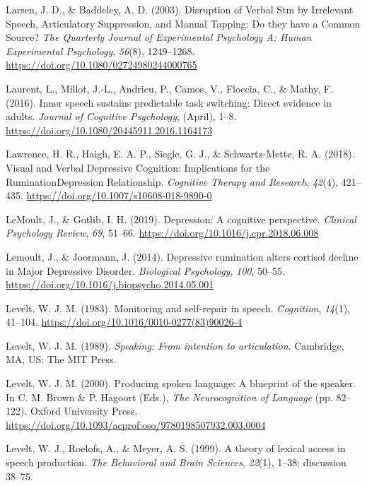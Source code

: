 \documentclass[a4paper,12pt,twoside,openright,oldfontcommands,final]{memoir}
\begin{document}
\leavevmode\hypertarget{ref-larsen_disruption_2003}{}%
Larsen, J. D., \& Baddeley, A. D. (2003). Disruption of Verbal Stm by Irrelevant Speech, Articulatory Suppression, and Manual Tapping: Do they have a Common Source? \emph{The Quarterly Journal of Experimental Psychology A: Human Experimental Psychology}, \emph{56}(8), 1249--1268. \url{https://doi.org/10.1080/02724980244000765}

\leavevmode\hypertarget{ref-Laurent2016}{}%
Laurent, L., Millot, J.-L., Andrieu, P., Camos, V., Floccia, C., \& Mathy, F. (2016). Inner speech sustains predictable task switching: Direct evidence in adults. \emph{Journal of Cognitive Psychology}, (April), 1--8. \url{https://doi.org/10.1080/20445911.2016.1164173}

\leavevmode\hypertarget{ref-lawrence_visual_2018}{}%
Lawrence, H. R., Haigh, E. A. P., Siegle, G. J., \& Schwartz-Mette, R. A. (2018). Visual and Verbal Depressive Cognition: Implications for the RuminationDepression Relationship. \emph{Cognitive Therapy and Research}, \emph{42}(4), 421--435. \url{https://doi.org/10.1007/s10608-018-9890-0}

\leavevmode\hypertarget{ref-lemoult_depression_2019}{}%
LeMoult, J., \& Gotlib, I. H. (2019). Depression: A cognitive perspective. \emph{Clinical Psychology Review}, \emph{69}, 51--66. \url{https://doi.org/10.1016/j.cpr.2018.06.008}

\leavevmode\hypertarget{ref-Lemoult2014}{}%
Lemoult, J., \& Joormann, J. (2014). Depressive rumination alters cortisol decline in Major Depressive Disorder. \emph{Biological Psychology}, \emph{100}, 50--55. \url{https://doi.org/10.1016/j.biopsycho.2014.05.001}

\leavevmode\hypertarget{ref-levelt_monitoring_1983}{}%
Levelt, W. J. M. (1983). Monitoring and self-repair in speech. \emph{Cognition}, \emph{14}(1), 41--104. \url{https://doi.org/10.1016/0010-0277(83)90026-4}

\leavevmode\hypertarget{ref-levelt_speaking_1989}{}%
Levelt, W. J. M. (1989). \emph{Speaking: From intention to articulation}. Cambridge, MA, US: The MIT Press.

\leavevmode\hypertarget{ref-brown_producing_2000}{}%
Levelt, W. J. M. (2000). Producing spoken language: A blueprint of the speaker. In C. M. Brown \& P. Hagoort (Eds.), \emph{The Neurocognition of Language} (pp. 82--122). Oxford University Press. \url{https://doi.org/10.1093/acprof:oso/9780198507932.003.0004}

\leavevmode\hypertarget{ref-levelt_theory_1999}{}%
Levelt, W. J., Roelofs, A., \& Meyer, A. S. (1999). A theory of lexical access in speech production. \emph{The Behavioral and Brain Sciences}, \emph{22}(1), 1--38; discussion 38--75.
\end{document}
